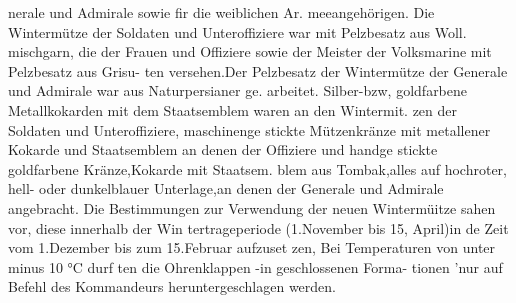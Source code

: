 nerale und Admirale sowie fir die weiblichen Ar.
meeangehörigen. Die Wintermütze der Soldaten
und Unteroffiziere war mit Pelzbesatz aus Woll.
mischgarn, die der Frauen und Offiziere sowie der
Meister der Volksmarine mit Pelzbesatz aus Grisu-
ten versehen.Der Pelzbesatz der Wintermütze der
Generale und Admirale war aus Naturpersianer ge.
arbeitet. Silber-bzw, goldfarbene Metallkokarden
mit dem Staatsemblem waren an den Wintermit.
zen der Soldaten und Unteroffiziere, maschinenge
stickte Mützenkränze mit metallener Kokarde und
Staatsemblem an denen der Offiziere und handge
stickte goldfarbene Kränze,Kokarde mit Staatsem.
blem aus Tombak,alles auf hochroter, hell- oder
dunkelblauer Unterlage,an denen der Generale
und Admirale angebracht.
Die Bestimmungen zur Verwendung der neuen
Wintermüitze sahen vor, diese innerhalb der Win
tertrageperiode (1.November bis 15, April)in de
Zeit vom 1.Dezember bis zum 15.Februar aufzuset
zen, Bei Temperaturen von unter minus 10 °C durf
ten die Ohrenklappen -in geschlossenen Forma-
tionen 'nur auf Befehl des Kommandeurs
heruntergeschlagen werden.